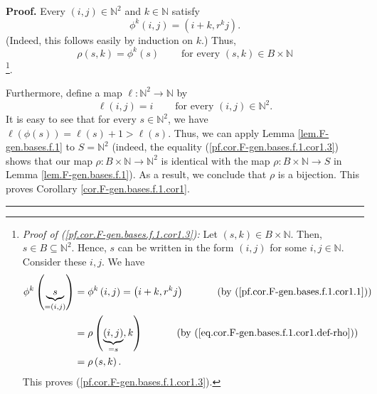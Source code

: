 \documentclass[numbers=enddot,12pt,final,onecolumn,notitlepage]{scrartcl}%
\theoremstyle{definition}
\newenvironment{proof}[1][Proof]{\noindent\textbf{#1.} }{\ \rule{0.5em}{0.5em}}
\begin{document}
\begin{proof}
Every $\left(  i,j\right)  \in\mathbb{N}^{2}$ and $k\in\mathbb{N}$ satisfy%
\begin{equation}
\phi^{k}\left(  i,j\right)  =\left(  i+k,r^{k}j\right)  .
\label{pf.cor.F-gen.bases.f.1.cor1.1}%
\end{equation}
(Indeed, this follows easily by induction on $k$.) Thus,%
\begin{equation}
\rho\left(  s,k\right)  =\phi^{k}\left(  s\right)
\ \ \ \ \ \ \ \ \ \ \text{for every }\left(  s,k\right)  \in B\times\mathbb{N}
\label{pf.cor.F-gen.bases.f.1.cor1.3}%
\end{equation}
\footnote{\textit{Proof of (\ref{pf.cor.F-gen.bases.f.1.cor1.3}):} Let
$\left(  s,k\right)  \in B\times\mathbb{N}$. Then, $s\in B\subseteq
\mathbb{N}^{2}$. Hence, $s$ can be written in the form $\left(  i,j\right)  $
for some $i,j\in\mathbb{N}$. Consider these $i,j$. We have%
\begin{align*}
\phi^{k}\left(  \underbrace{s}_{=\left(  i,j\right)  }\right)   &  =\phi
^{k}\left(  i,j\right)  =\left(  i+k,r^{k}j\right)
\ \ \ \ \ \ \ \ \ \ \left(  \text{by (\ref{pf.cor.F-gen.bases.f.1.cor1.1}%
)}\right) \\
&  =\rho\left(  \underbrace{\left(  i,j\right)  }_{=s},k\right)
\ \ \ \ \ \ \ \ \ \ \left(  \text{by
(\ref{eq.cor.F-gen.bases.f.1.cor1.def-rho})}\right) \\
&  =\rho\left(  s,k\right)  .
\end{align*}
This proves (\ref{pf.cor.F-gen.bases.f.1.cor1.3}).}.

Furthermore, define a map $\ell:\mathbb{N}^{2}\rightarrow\mathbb{N}$ by
\[
\ell\left(  i,j\right)  =i\ \ \ \ \ \ \ \ \ \ \text{for every }\left(
i,j\right)  \in\mathbb{N}^{2}.
\]
It is easy to see that for every $s\in\mathbb{N}^{2}$, we have $\ell\left(
\phi\left(  s\right)  \right)  =\ell\left(  s\right)  +1>\ell\left(  s\right)
$. Thus, we can apply Lemma \ref{lem.F-gen.bases.f.1} to $S=\mathbb{N}^{2}$
(indeed, the equality (\ref{pf.cor.F-gen.bases.f.1.cor1.3}) shows that our map
$\rho:B\times\mathbb{N}\rightarrow\mathbb{N}^{2}$ is identical with the map
$\rho:B\times\mathbb{N}\rightarrow S$ in Lemma \ref{lem.F-gen.bases.f.1}). As
a result, we conclude that $\rho$ is a bijection. This proves Corollary
\ref{cor.F-gen.bases.f.1.cor1}.
\end{proof}
\end{document}
